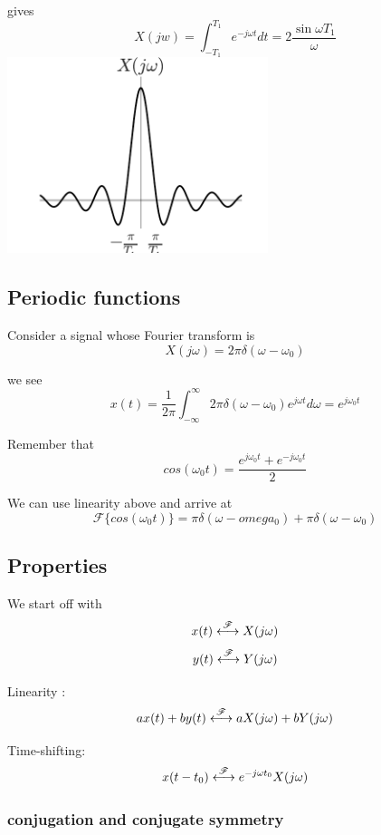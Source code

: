 gives 
\[
X(jw) = \int_{-T_1}^{T_1} e^{-j\omega t} dt = 2 \frac{\sin \omega T_1}{\omega}
\]
\includegraphics[width=3in]{notes.02.sinc.pdf}


\subsection{Periodic functions}
Consider a signal whose Fourier transform is 
\[
X(j\omega) = 2 \pi \delta(\omega - \omega_0)
\]

we see
\[
x(t) = \frac{1}{2\pi}\int_{-\infty}^{\infty} 2\pi \delta(\omega - \omega_0) e^{j \omega t} d\omega = e^{j\omega_0  t}
\]


Remember that
\[
cos(\omega_0 t) = \frac{e^{j\omega_0 t} + e^{-j\omega_0 t}}{2}
\]

We can use linearity above and arrive at 
\[
\mathscr{F} \{ cos(\omega_0 t) \} = \pi \delta(\omega - omega_0) + \pi \delta(\omega - \omega_0)
\]


\subsection{Properties}
We start off with 
\[ 
x(t) \stackrel{\mathscr{F}}{\longleftrightarrow} X(j\omega)
\]
\[ 
y(t) \stackrel{\mathscr{F}}{\longleftrightarrow} Y(j\omega)
\]

Linearity : 
\[
ax(t) + by(t) \stackrel{\mathscr{F}}{\longleftrightarrow} aX(j\omega) + bY(j\omega)
\]

Time-shifting: 
\[
x(t - t_0) \stackrel{\mathscr{F}}{\longleftrightarrow} e^{-j\omega t_0}X(j\omega)
\]

\subsubsection{conjugation and conjugate symmetry}
